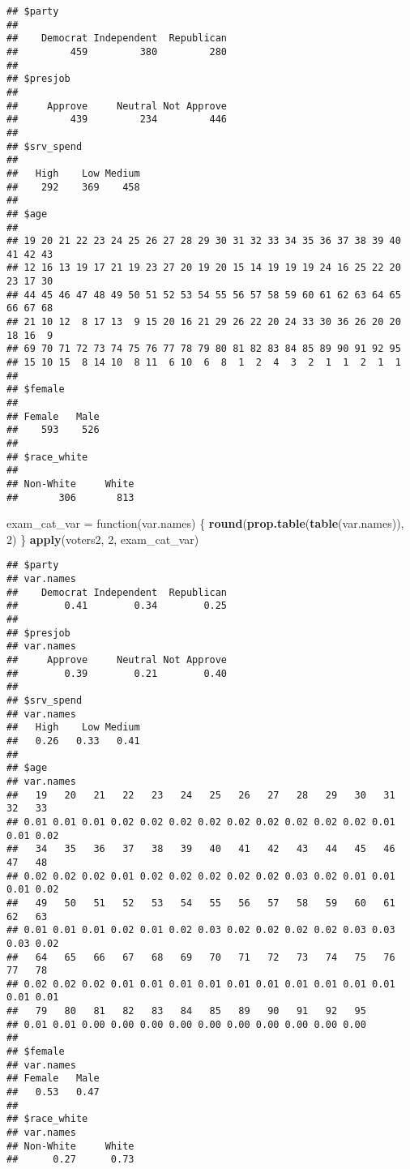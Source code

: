 \documentclass[]{article}
\newenvironment{Shaded}{\begin{snugshade}}{\end{snugshade}}
\newcommand{\KeywordTok}[1]{\textcolor[rgb]{0.13,0.29,0.53}{\textbf{{#1}}}}
\newcommand{\DecValTok}[1]{\textcolor[rgb]{0.00,0.00,0.81}{{#1}}}
\newcommand{\StringTok}[1]{\textcolor[rgb]{0.31,0.60,0.02}{{#1}}}
\newcommand{\NormalTok}[1]{{#1}}
\begin{document}
\begin{verbatim}
## $party
## 
##    Democrat Independent  Republican 
##         459         380         280 
## 
## $presjob
## 
##     Approve     Neutral Not Approve 
##         439         234         446 
## 
## $srv_spend
## 
##   High    Low Medium 
##    292    369    458 
## 
## $age
## 
## 19 20 21 22 23 24 25 26 27 28 29 30 31 32 33 34 35 36 37 38 39 40 41 42 43 
## 12 16 13 19 17 21 19 23 27 20 19 20 15 14 19 19 19 24 16 25 22 20 23 17 30 
## 44 45 46 47 48 49 50 51 52 53 54 55 56 57 58 59 60 61 62 63 64 65 66 67 68 
## 21 10 12  8 17 13  9 15 20 16 21 29 26 22 20 24 33 30 36 26 20 20 18 16  9 
## 69 70 71 72 73 74 75 76 77 78 79 80 81 82 83 84 85 89 90 91 92 95 
## 15 10 15  8 14 10  8 11  6 10  6  8  1  2  4  3  2  1  1  2  1  1 
## 
## $female
## 
## Female   Male 
##    593    526 
## 
## $race_white
## 
## Non-White     White 
##       306       813
\end{verbatim}

\begin{Shaded}
\begin{Highlighting}[]
\NormalTok{exam_cat_var =}\StringTok{ }\NormalTok{function(var.names) \{}
    \KeywordTok{round}\NormalTok{(}\KeywordTok{prop.table}\NormalTok{(}\KeywordTok{table}\NormalTok{(var.names)), }\DecValTok{2}\NormalTok{)}
\NormalTok{\}}
\KeywordTok{apply}\NormalTok{(voters2, }\DecValTok{2}\NormalTok{, exam_cat_var)}
\end{Highlighting}
\end{Shaded}

\begin{verbatim}
## $party
## var.names
##    Democrat Independent  Republican 
##        0.41        0.34        0.25 
## 
## $presjob
## var.names
##     Approve     Neutral Not Approve 
##        0.39        0.21        0.40 
## 
## $srv_spend
## var.names
##   High    Low Medium 
##   0.26   0.33   0.41 
## 
## $age
## var.names
##   19   20   21   22   23   24   25   26   27   28   29   30   31   32   33 
## 0.01 0.01 0.01 0.02 0.02 0.02 0.02 0.02 0.02 0.02 0.02 0.02 0.01 0.01 0.02 
##   34   35   36   37   38   39   40   41   42   43   44   45   46   47   48 
## 0.02 0.02 0.02 0.01 0.02 0.02 0.02 0.02 0.02 0.03 0.02 0.01 0.01 0.01 0.02 
##   49   50   51   52   53   54   55   56   57   58   59   60   61   62   63 
## 0.01 0.01 0.01 0.02 0.01 0.02 0.03 0.02 0.02 0.02 0.02 0.03 0.03 0.03 0.02 
##   64   65   66   67   68   69   70   71   72   73   74   75   76   77   78 
## 0.02 0.02 0.02 0.01 0.01 0.01 0.01 0.01 0.01 0.01 0.01 0.01 0.01 0.01 0.01 
##   79   80   81   82   83   84   85   89   90   91   92   95 
## 0.01 0.01 0.00 0.00 0.00 0.00 0.00 0.00 0.00 0.00 0.00 0.00 
## 
## $female
## var.names
## Female   Male 
##   0.53   0.47 
## 
## $race_white
## var.names
## Non-White     White 
##      0.27      0.73
\end{verbatim}
\end{document}
